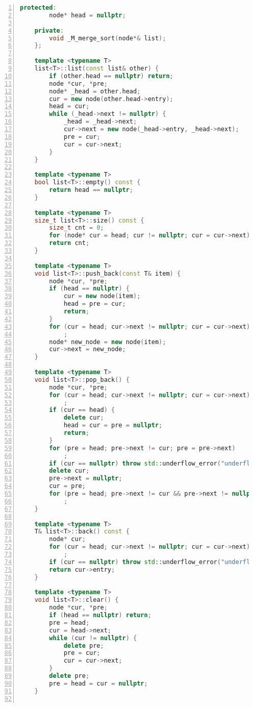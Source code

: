 \documentclass{article}
\begin{document}
\begin{lstlisting}[xleftmargin = 2em,xrightmargin = 2em, aboveskip = 0.5em, numbers = left, language = C++]
    protected:
        node* head = nullptr;

    private:
        void _M_merge_sort(node*& list);
    };

    template <typename T>
    list<T>::list(const list& other) {
        if (other.head == nullptr) return;
        node *cur, *pre;
        node* _head = other.head;
        cur = new node(other.head->entry);
        head = cur;
        while (_head->next != nullptr) {
            _head = _head->next;
            cur->next = new node(_head->entry, _head->next);
            pre = cur;
            cur = cur->next;
        }
    }

    template <typename T>
    bool list<T>::empty() const {
        return head == nullptr;
    }

    template <typename T>
    size_t list<T>::size() const {
        size_t cnt = 0;
        for (node* cur = head; cur != nullptr; cur = cur->next) cnt++;
        return cnt;
    }

    template <typename T>
    void list<T>::push_back(const T& item) {
        node *cur, *pre;
        if (head == nullptr) {
            cur = new node(item);
            head = pre = cur;
            return;
        }
        for (cur = head; cur->next != nullptr; cur = cur->next)
            ;
        node* new_node = new node(item);
        cur->next = new_node;
    }

    template <typename T>
    void list<T>::pop_back() {
        node *cur, *pre;
        for (cur = head; cur->next != nullptr; cur = cur->next)
            ;
        if (cur == head) {
            delete cur;
            head = cur = pre = nullptr;
            return;
        }
        for (pre = head; pre->next != cur; pre = pre->next)
            ;
        if (cur == nullptr) throw std::underflow_error("underflow");
        delete cur;
        pre->next = nullptr;
        cur = pre;
        for (pre = head; pre->next != cur && pre->next != nullptr; pre = pre->next)
            ;
    }

    template <typename T>
    T& list<T>::back() const {
        node* cur;
        for (cur = head; cur->next != nullptr; cur = cur->next)
            ;
        if (cur == nullptr) throw std::underflow_error("underflow");
        return cur->entry;
    }

    template <typename T>
    void list<T>::clear() {
        node *cur, *pre;
        if (head == nullptr) return;
        pre = head;
        cur = head->next;
        while (cur != nullptr) {
            delete pre;
            pre = cur;
            cur = cur->next;
        }
        delete pre;
        pre = head = cur = nullptr;
    }


\end{lstlisting}
\end{document}
